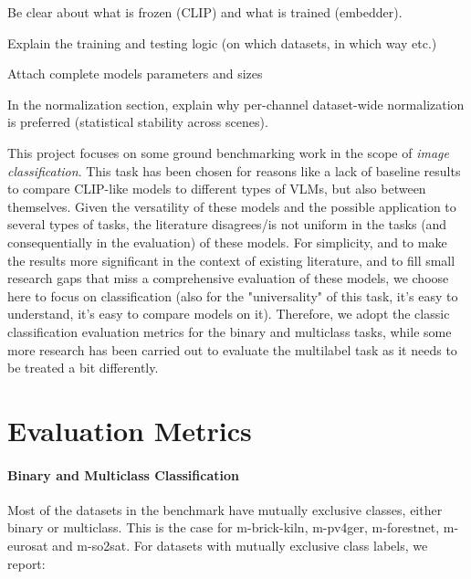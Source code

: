 \documentclass[a4paper, oneside, english]{sapthesis} %
\begin{document}
Be clear about what is frozen (CLIP) and what is trained (embedder).

Explain the training and testing logic (on which datasets, in which way etc.)

Attach complete models parameters and sizes

In the normalization section, explain why per-channel dataset-wide normalization is preferred (statistical stability across scenes).


This project focuses on some ground benchmarking work in the scope of \emph{image classification}. This task has been chosen for reasons like a lack of baseline results to compare CLIP-like models to different types of VLMs, but also between themselves. Given the versatility of these models and the possible application to several types of tasks, the literature disagrees/is not uniform in the tasks (and consequentially in the evaluation) of these models. For simplicity, and to make the results more significant in the context of existing literature, and to fill small research gaps that miss a comprehensive evaluation of these models, we choose here to focus on classification (also for the "universality" of this task, it's easy to understand, it's easy to compare models on it). Therefore, we adopt the classic classification evaluation metrics for the binary and multiclass tasks, while some more research has been carried out to evaluate the multilabel task as it needs to be treated a bit differently.

\section{Evaluation Metrics}

\paragraph{Binary and Multiclass Classification}

Most of the datasets in the benchmark have mutually exclusive classes, either binary or multiclass. This is the case for m-brick-kiln, m-pv4ger, m-forestnet, m-eurosat and m-so2sat. For datasets with mutually exclusive class labels, we report:
\end{document}
